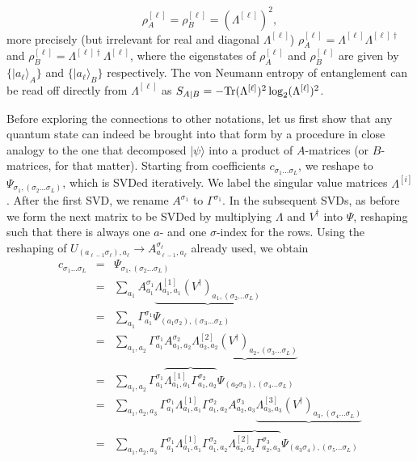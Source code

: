 \documentclass[a4paper,10pt,oneside,onecolumn,1p,times]{elsarticle}
\newcommand{\tr}{{\rm Tr }}
\newcommand{\ket}[1]{\mbox{$| #1  \rangle$}}
\begin{document}
\begin{equation}
\rho_A^{[\ell]} = \rho_B^{[\ell]} = (\Lambda^{[\ell]})^2 ,
\end{equation}
more precisely (but irrelevant for real and diagonal $\Lambda^{[\ell]}$) $\rho_A^{[\ell]} = \Lambda^{[\ell]}\Lambda^{[\ell]\dagger}$ and $\rho_B^{[\ell]} = \Lambda^{[\ell]\dagger}\Lambda^{[\ell]}$,
where the eigenstates of $\rho_A^{[\ell]}$ and $\rho_B^{[\ell]}$ are given by $\{ \ket{a_\ell}_A \}$ and $\{ \ket{a_\ell}_B \}$ respectively. The von Neumann entropy of entanglement can be read off directly from $\Lambda^{[\ell]}$ as $S_{A|B} = -\tr (\Lambda^{[\ell]})^2 \log_2 (\Lambda^{[\ell]})^2$. 

Before exploring the connections to other notations, let us first show that any quantum state can indeed be brought into that form by a procedure in close analogy to the one that decomposed $\ket{\psi}$ into a product of $A$-matrices (or $B$-matrices, for that matter). Starting from coefficients $c_{\sigma_1\ldots\sigma_L}$, we reshape to $\Psi_{\sigma_1, (\sigma_2 \ldots \sigma_L)}$, which is SVDed iteratively. We label the singular value matrices $\Lambda^{[i]}$. After the first SVD, we rename $A^{\sigma_1}$ to $\Gamma^{\sigma_1}$. In the subsequent SVDs, as before we form the next matrix to be SVDed by multiplying $\Lambda$ and $V^\dagger$ into $\Psi$, reshaping such that there is always one $a$- and one $\sigma$-index for the rows. Using the reshaping of $U_{(a_{\ell-1}\sigma_\ell), a_{\ell}} \rightarrow A^{\sigma_\ell}_{a_{\ell-1},a_\ell}$ already used, we obtain
\begin{eqnarray*}
c_{\sigma_1\ldots\sigma_L} &=& \Psi_{\sigma_1, (\sigma_2 \ldots \sigma_L)} \\
&=& \sum_{a_1} A^{\sigma_1}_{a_1} \underbrace{\Lambda^{[1]}_{a_1,a_1} (V^\dagger)_{a_1, (\sigma_2 \ldots \sigma_L)}} \\
&=& \sum_{a_1} \Gamma^{\sigma_1}_{a_1} \Psi_{(a_1\sigma_2), (\sigma_3 \ldots \sigma_L)} \\
&=& \sum_{a_1,a_2} \Gamma^{\sigma_1}_{a_1} A^{\sigma_2}_{a_1,a_2} \underbrace{\Lambda^{[2]}_{a_2,a_2} (V^\dagger)_{a_2, (\sigma_3 \ldots \sigma_L)}} \\
&=& \sum_{a_1,a_2} \Gamma^{\sigma_1}_{a_1} \overbrace{\Lambda^{[1]}_{a_1,a_1} \Gamma^{\sigma_2}_{a_1,a_2}} \Psi_{(a_2\sigma_3), (\sigma_4 \ldots \sigma_L)} \\
&=& \sum_{a_1,a_2,a_3} \Gamma^{\sigma_1}_{a_1} \Lambda^{[1]}_{a_1,a_1} \Gamma^{\sigma_2}_{a_1,a_2} A^{\sigma_3}_{a_2,a_3}  \underbrace{\Lambda^{[3]}_{a_3,a_3} (V^\dagger)_{a_3, (\sigma_4 \ldots \sigma_L)}} \\ 
&=& \sum_{a_1,a_2,a_3} \Gamma^{\sigma_1}_{a_1} \Lambda^{[1]}_{a_1,a_1} \Gamma^{\sigma_2}_{a_1,a_2} \overbrace{\Lambda^{[2]}_{a_2,a_2} \Gamma^{\sigma_3}_{a_2,a_3}}  \Psi_{(a_3\sigma_4), (\sigma_5 \ldots \sigma_L)} 
\end{eqnarray*}
\end{document}
